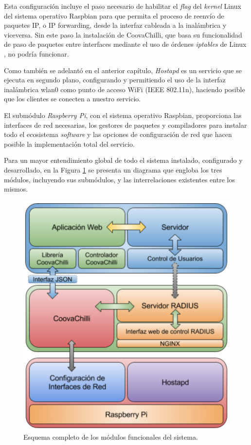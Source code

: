 Esta configuración incluye el paso necesario de habilitar el \emph{flag} del \emph{kernel} Linux del sistema operativo Raspbian para que permita el proceso de reenvío de paquetes IP, o IP forwarding, desde la interfaz cableada a la inalámbrica y viceversa. Sin este paso la instalación de CoovaChilli, que basa su funcionalidad de paso de paquetes entre interfaces mediante el uso de órdenes \emph{iptables} de Linux \cite{TUNTAP2}, no podría funcionar.

Como también se adelantó en el anterior capítulo, \emph{Hostapd} es un servicio que se ejecuta en segundo plano, configurando y permitiendo el uso de la interfaz inalámbrica wlan0 como punto de acceso WiFi (IEEE 802.11n), haciendo posible que los clientes se conecten a nuestro servicio.

El submódulo \emph{Raspberry Pi}, con el sistema operativo Raspbian, proporciona las interfaces de red necesarias, los gestores de paquetes y compiladores para instalar todo el ecosistema \emph{software} y las opciones de configuración de red que hacen posible la implementación total del servicio.

Para un mayor entendimiento global de todo el sistema instalado, configurado y desarrollado, en la Figura \ref{modulosTotal} se presenta un diagrama que engloba los tres módulos, incluyendo sus submódulos, y las interrelaciones existentes entre los mismos.

\begin{figure}[!t]
\begin{center}
\includegraphics[width=0.75\linewidth]{./4_AnalisisFuncional/Img/modulosTotal.png}
\end{center}
\caption{Esquema completo de los módulos funcionales del sistema.}
\label{modulosTotal}
\end{figure}